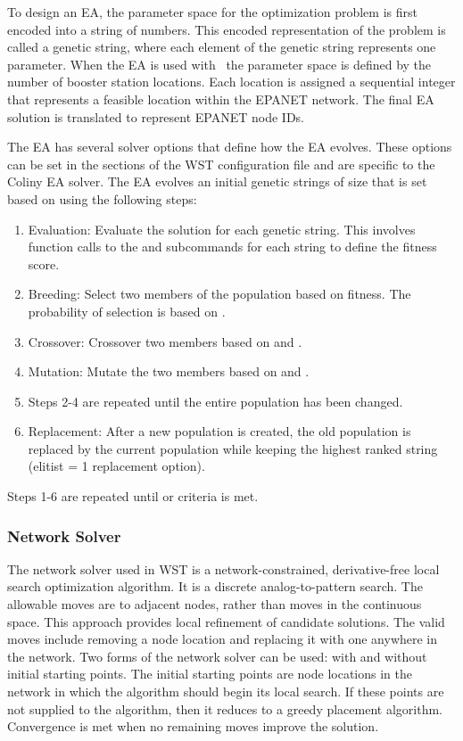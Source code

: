 To design an EA, the parameter space for the optimization problem is first 
encoded into a string of numbers. This encoded representation of the problem 
is called a genetic string, where each element of the genetic string represents 
one parameter. When the EA is used with \, the parameter space 
is defined by the number of booster station locations. Each location is assigned a sequential 
integer that represents a feasible location within the EPANET network. The final EA solution is 
translated to represent EPANET node IDs.

The EA has several solver options that define how the EA evolves. These options can be set in the 
\code{[solver][options]} sections of the  WST configuration file and are specific to the Coliny EA solver. 
The EA evolves an initial genetic strings of size  that is 
set based on  using the following steps:
\begin{enumerate}
\item Evaluation: Evaluate the solution for each genetic string. This involves function 
calls to the  and  subcommands for each string to define the fitness score.  
\item Breeding: Select two members of the population based on fitness. The 
probability of selection is based on .  
\item Crossover: Crossover two members based on  and . 
\item Mutation: Mutate the two members based on  and .
\item Steps 2-4 are repeated until the entire population has been changed.
\item Replacement: After a new population is created, the old population is 
replaced by the current population while keeping the highest ranked string 
(elitist = 1 replacement option).
\end{enumerate}
Steps 1-6 are repeated until  or  criteria is met. 

\subsubsection{Network Solver}\label{boostermsx_coliny_statemachine}

The network solver used in WST is a network-constrained, derivative-free local search optimization algorithm. 
It is a discrete analog-to-pattern search. The allowable moves are to adjacent nodes, rather than moves in the 
continuous space. This approach provides local refinement of candidate solutions. The valid moves include
removing a node location and replacing it with one anywhere in the network. Two forms of the network solver can be 
used: with and without initial starting points. The initial starting points are node locations in the network
in which the algorithm should begin its local search. If these points are not supplied to the algorithm, 
then it reduces to a greedy placement algorithm. Convergence is met when no remaining moves improve the solution.

